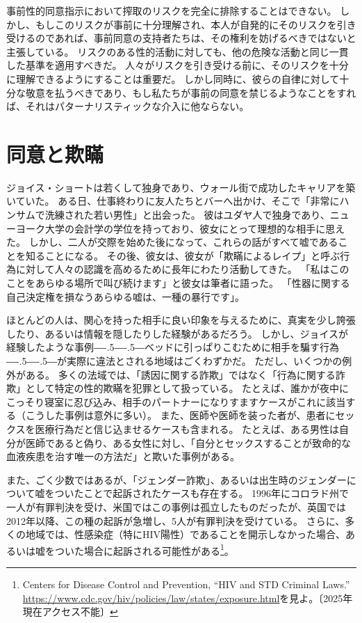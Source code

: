 \documentclass[paper=a4,book,openany]{jlreq}
\def\DDASH{―\kern-.5\zw―\kern-.5\zw―} %
\begin{document}
事前性的同意指示において搾取のリスクを完全に排除することはできない。
しかし、もしこのリスクが事前に十分理解され、本人が自発的にそのリスクを引き受けるのであれば、事前同意の支持者たちは、その権利を妨げるべきではないと主張している。
リスクのある性的活動に対しても、他の危険な活動と同じ一貫した基準を適用すべきだ。
人々がリスクを引き受ける前に、そのリスクを十分に理解できるようにすることは重要だ。
しかし同時に、彼らの自律に対して十分な敬意を払うべきであり、もし私たちが事前の同意を禁じるようなことをすれば、それはパターナリスティックな介入に他ならない。

\section{同意と欺瞞}

ジョイス・ショートは若くして独身であり、ウォール街で成功したキャリアを築いていた。
ある日、仕事終わりに友人たちとバーへ出かけ、そこで「非常にハンサムで洗練された若い男性」と出会った。
彼はユダヤ人で独身であり、ニューヨーク大学の会計学の学位を持っており、彼女にとって理想的な相手に思えた。
しかし、二人が交際を始めた後になって、これらの話がすべて嘘であることを知ることになる。
その後、彼女は、彼女が「欺瞞によるレイプ」と呼ぶ行為に対して人々の認識を高めるために長年にわたり活動してきた。
「私はこのことをあらゆる場所で叫び続けます」と彼女は筆者に語った。
「性器に関する自己決定権を損なうあらゆる嘘は、一種の暴行です」\citep{mcarthur16:_is_lying_get_laid_form_sexual_assaul}。

ほとんどの人は、関心を持った相手に良い印象を与えるために、真実を少し誇張したり、あるいは情報を隠したりした経験があるだろう。
しかし、ジョイスが経験したような事例{\DDASH}ベッドに引っぱりこむために相手を騙す行為{\DDASH}が実際に違法とされる地域はごくわずかだ。
ただし、いくつかの例外がある。
多くの法域では、「誘因に関する詐欺」ではなく「行為に関する詐欺」として特定の性的欺瞞を犯罪として扱っている。
たとえば、誰かが夜中にこっそり寝室に忍び込み、相手のパートナーになりすますケースがこれに該当する（こうした事例は意外に多い）。
また、医師や医師を装った者が、患者にセックスを医療行為だと信じ込ませるケースも含まれる。
たとえば、ある男性は自分が医師であると偽り、ある女性に対し、「自分とセックスすることが致命的な血液疾患を治す唯一の方法だ」と欺いた事例がある\citep{chavez87:_woman_says_ruse_trick_her_sex}。

また、ごく少数ではあるが、「ジェンダー詐欺」、あるいは出生時のジェンダーについて嘘をついたことで起訴されたケースも存在する。
1996年にコロラド州で一人が有罪判決を受け、米国ではこの事例は孤立したものだったが、英国では2012年以降、この種の起訴が急増し、5人が有罪判決を受けている\citep{wilkinson17:_troub_case_uk_woman_convic_gender_fraud}。
さらに、多くの地域では、性感染症（特にHIV陽性）であることを開示しなかった場合、あるいは嘘をついた場合に起訴される可能性がある\footnote{Centers for Disease Control and Prevention, ``HIV and STD Criminal Laws.'' \url{https://www.cdc.gov/hiv/policies/law/states/exposure.html}を見よ。〔2025年現在アクセス不能〕}。
\end{document}
